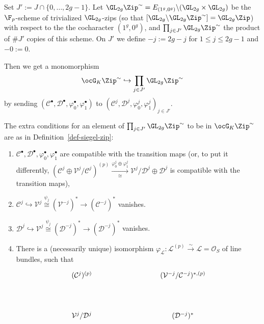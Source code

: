\documentclass[a4paper]{scrartcl} %
\numberwithin{equation}{section}
\begin{document}
\begin{Proof}
  Set $J':= J\cap \{0,\dotsc,2g-1\}$. Let $\GL_{2g}\Zip^{\sim}=E_{(1^g,0^g)}\backslash (\GL_{2g}\times \GL_{2g})$ be the $\F_p$-scheme of trivialized $\GL_{2g}$-zips (so that $[\GL_{2g}\backslash\GL_{2g}\Zip^{\sim}]=\GL_{2g}\Zip$) with respect to the the cocharacter $(1^g,0^g)$, and $\prod_{j\in J'}\GL_{2g}\Zip^{\sim}$ the product of $\#J'$ copies of this scheme. On $J'$ we define $-j:=2g-j$ for $1\leq j \leq 2g-1$ and $-0:=0$.

  Then we get a monomorphism
  \begin{equation}\label{eq:GKZipEmb}
    \ocG_K\Zip^{\sim} \hookrightarrow \prod_{j\in J'}\GL_{2g}\Zip^{\sim}
  \end{equation}
  by sending $(\mathcal{C}^\bullet,\mathcal{D}^\bullet,\varphi_{0}^{\bullet},\varphi_{1}^{\bullet})$ to $\left(\mathcal{C}^j,\mathcal{D}^j,\varphi_{0}^{j},\varphi_{1}^{j}\right)_{j\in J'}$.

  The extra conditions for an element of $\prod_{j\in J'}\GL_{2g}\Zip^{\sim}$ to be in $\ocG_K\Zip^{\sim}$ are as in Definition~\ref{def-siegel-zip}:
  \begin{enumerate}[(1)]
  \item \label{item:glzip-prod-cond-1} $\mathcal{C}^\bullet,\mathcal{D}^\bullet,\varphi_{0}^{\bullet},\varphi_{1}^{\bullet}$ are compatible with the transition maps (or, to put it differently, ${(\mathcal{C}^j\oplus \mathcal{V}^j/\mathcal{C}^j)^{(p)}}\xrightarrow[\cong]{\varphi_0^j\oplus\varphi_1^j}{\mathcal{V}^j/\mathcal{D}^j\oplus \mathcal{D}^j}$ is compatible with the transition maps),
  \item \label{item:glzip-prod-cond-2} $\mathcal{C}^j \hookrightarrow \mathcal{V}^j \overset{\psi_j}\cong (\mathcal{V}^{-j})^* \to (\mathcal{C}^{-j})^*$ vanishes.
  \item \label{item:glzip-prod-cond-3} $\mathcal{D}^j \hookrightarrow \mathcal{V}^j \overset{\psi_j}\cong (\mathcal{D}^{-j})^* \to (\mathcal{D}^{-j})^*$ vanishes.
  \item \label{item:glzip-prod-cond-4} There is a (necessarily unique) isomorphism  $\varphi_\mathcal{L}\colon \mathcal{L}^{(p)}\xrightarrow{\sim}\mathcal{L}=\mathcal{O}_S$ of line bundles, such that
    \begin{equation*}
      \begin{tikzpicture}[node distance=4cm, auto]
        \node (X) at (0,2) {$(\mathcal{C}^j)^{(p)}$};
        \node (Z) at (5,2) {$(\mathcal{V}^{-j}/\mathcal{C}^{-j})^{*,(p)}$};
        \node (Zs) at (5,0) {$(\mathcal{D}^{-j})^*$};
        \node (Xs) at (0,0) {$\mathcal{V}^j/\mathcal{D}^j$};
        

\end{tikzpicture}
\end{equation*}
\end{enumerate}
\end{Proof}
\end{document}
